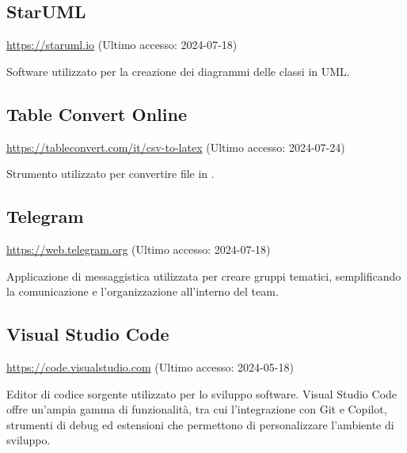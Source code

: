 \subsection{StarUML}
\par \href{https://staruml.io}{https://staruml.io} (Ultimo accesso: 2024-07-18)
\par Software utilizzato per la creazione dei diagrammi delle classi in UML.

\subsection{Table Convert Online}
\par \href{https://tableconvert.com/it/csv-to-latex}{https://tableconvert.com/it/csv-to-latex} (Ultimo accesso: 2024-07-24)
\par Strumento utilizzato per convertire file  in .

\subsection{Telegram}
\par \href{https://web.telegram.org}{https://web.telegram.org} (Ultimo accesso: 2024-07-18)
\par Applicazione di messaggistica utilizzata per creare gruppi tematici, semplificando la comunicazione e l'organizzazione all'interno del team.
    
\subsection{Visual Studio Code}
\par \href{https://code.visualstudio.com}{https://code.visualstudio.com} (Ultimo accesso: 2024-05-18)
\par Editor di codice sorgente utilizzato per lo sviluppo software. Visual Studio Code offre un’ampia gamma di funzionalità, tra cui l'integrazione con Git e Copilot, strumenti di debug ed estensioni che permettono di personalizzare l’ambiente di sviluppo.
